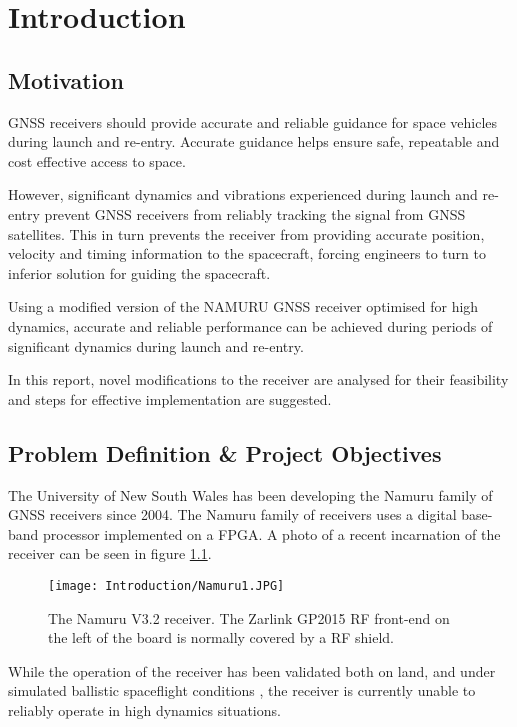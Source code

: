 \chapter{Introduction}\label{ch:intro}

\section{Motivation}
\ac{GNSS} receivers should provide accurate and reliable guidance for space vehicles during launch and re-entry. Accurate guidance helps ensure safe, repeatable and cost effective access to space.

However, significant dynamics and vibrations experienced during launch and re-entry prevent \ac{GNSS} receivers from reliably tracking the signal from \ac{GNSS} satellites. This in turn prevents the receiver from providing accurate position, velocity and timing information to the spacecraft, forcing engineers to turn to inferior solution for guiding the spacecraft.

Using a modified version of the \ac{NAMURU} \ac{GNSS} receiver optimised for high dynamics, accurate and reliable performance can be achieved during periods of significant dynamics during launch and re-entry. 

In this report, novel modifications to the receiver are analysed for their feasibility and steps for effective implementation are suggested.

\section{Problem Definition \& Project Objectives}

The University of New South Wales has been developing the Namuru family of \ac{GNSS} receivers since 2004\cite{MumfordNamuru}. The Namuru family of receivers uses a digital base-band processor implemented on a \ac{FPGA}\cite{Glennon11aquariusfirmware}. A photo of a recent incarnation of the receiver can be seen in figure \ref{fig:Namuru1}.

\begin{figure}[!htb] 
    \centering
    \texttt{[image: Introduction/Namuru1.JPG]} 
    \caption{The Namuru V3.2 receiver. The Zarlink GP2015 \ac{RF} front-end on the left of the board is normally covered by a \ac{RF} shield.}
    \label{fig:Namuru1}
\end{figure}

While the operation of the receiver has been validated both on land, and under simulated ballistic spaceflight conditions \cite{NamuruSpaceflight1,NamuruSpaceflight2}, the receiver is currently unable to reliably operate in high dynamics situations. 

